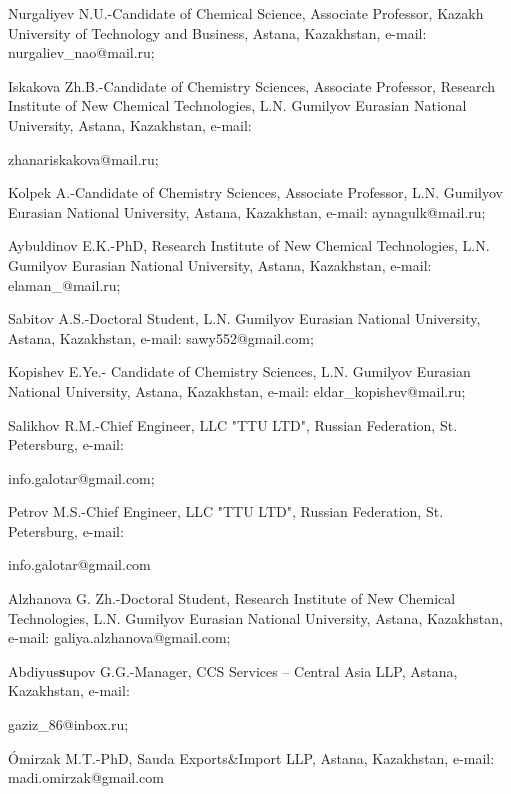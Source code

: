 \begin{noparindent}
Nurgaliyev N.U.-Candidate of Chemical Science, Associate Professor,
Kazakh University of Technology and Business, Astana, Kazakhstan,
e-mail: nurgaliev\_nao@mail.ru;

Iskakova Zh.B.-Candidate of Chemistry Sciences, Associate Professor,
Research Institute of New Chemical Technologies, L.N. Gumilyov Eurasian
National University, Astana, Kazakhstan, e-mail:

zhanariskakova@mail.ru;

Kolpek A.-Candidate of Chemistry Sciences, Associate Professor, L.N.
Gumilyov Eurasian National University, Astana, Kazakhstan, e-mail:
aynagulk@mail.ru;

Aybuldinov E.K.-PhD, Research Institute of New Chemical Technologies,
L.N. Gumilyov Eurasian National University, Astana, Kazakhstan, e-mail:
elaman\_@mail.ru;

Sabitov A.S.-Doctoral Student, L.N. Gumilyov Eurasian National
University, Astana, Kazakhstan, e-mail: sawy552@gmail.com;

Kopishev E.Ye.- Candidate of Chemistry Sciences, L.N. Gumilyov Eurasian
National University, Astana, Kazakhstan, e-mail:
eldar\_kopishev@mail.ru;

Salikhov R.M.-Chief Engineer, LLC "TTU LTD", Russian Federation, St.
Petersburg, e-mail:

info.galotar@gmail.com;

Petrov M.S.-Chief Engineer, LLC "TTU LTD", Russian Federation, St.
Petersburg, e-mail:

info.galotar@gmail.com

Alzhanova G. Zh.-Doctoral Student, Research Institute of New Chemical
Technologies, L.N. Gumilyov Eurasian National University, Astana,
Kazakhstan, e-mail: galiya.alzhanova@gmail.com;

Abdiyus{\bfseries s}upov G.G.-Manager, CCS Services -- Central Asia LLP,
Astana, Kazakhstan, e-mail:

gaziz\_86@inbox.ru;

Ómirzak M.T.-PhD, Sauda Exports\&Import LLP, Astana, Kazakhstan, e-mail:
madi.omirzak@gmail.com
\end{noparindent}
